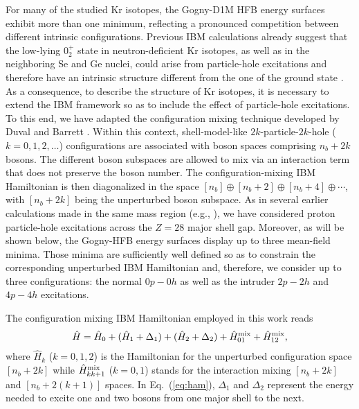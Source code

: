 \documentclass[twocolumn,showpacs,amsmath,amssymb,superscriptaddress]{revtex4-1}
\begin{document}
For many of the studied Kr isotopes, the Gogny-D1M HFB energy surfaces 
exhibit more than one minimum, reflecting a pronounced competition 
between different intrinsic configurations. Previous IBM calculations  
already suggest that the  low-lying $0^+_2$ state in neutron-deficient 
Kr isotopes, as well as in the neighboring Se and Ge nuclei, could 
arise from particle-hole excitations and therefore have an intrinsic 
structure different from the one of the ground state 
\cite{kaup1979,duval1983,padilla2006}. As a consequence, to describe 
the structure of Kr isotopes, it is necessary to extend the IBM 
framework so as to include the effect of particle-hole excitations. To 
this end, we have adapted the configuration mixing technique  developed 
by Duval and Barrett \cite{duval1981,duval1982}. Within this context, 
shell-model-like $2k$-particle-$2k$-hole ($k=0,1,2,\ldots$) 
configurations are associated with boson spaces comprising $n_b+2k$ 
bosons. The different boson subspaces are allowed to mix via an 
interaction term that does not preserve the boson number. The 
configuration-mixing IBM Hamiltonian is then diagonalized in the space 
$[n_b]\oplus [n_b+2]\oplus [n_b+4]\oplus\cdots$, with $[n_b+2k]$ being 
the unperturbed boson subspace. As in several earlier calculations made
in the same mass region (e.g.,
\cite{duval1983,padilla2006,nomura2017ge}), we have  considered proton
particle-hole excitations across the $Z=28$ major shell gap. 
Moreover, as will be shown below, the Gogny-HFB energy surfaces display up to three 
mean-field minima. Those minima are sufficiently well defined so as to 
constrain the corresponding unperturbed IBM Hamiltonian and, therefore, 
we consider up to three configurations: the normal $0p-0h$ as well as 
the intruder $2p-2h$ and $4p-4h$ excitations. 


The configuration mixing IBM Hamiltonian employed in this work reads
\begin{eqnarray} 
\label{eq:ham}
 \hat H = \hat H_{0} + (\hat H_{1} + \Delta_{1}) + (\hat H_{2} +
 \Delta_{2}) + \hat H_{01}^{\rm
 mix} + \hat H_{12}^{\rm mix}, %
\end{eqnarray}
where $\hat H_k$ ($k=0,1,2$) is the Hamiltonian for the unperturbed 
configuration space $[n_b+2k]$ while $\hat H^{\rm mix}_{kk+1}$ ($k=0,1$)
stands for the interaction mixing $[n_b+2k]$ and $[n_b+2(k+1)]$
spaces. In Eq.~(\ref{eq:ham}), $\Delta_1$ and $\Delta_2$ represent the
energy needed to excite one and two bosons from one major shell to the next.
\end{document}
